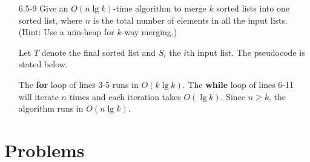 \begin{enumerate}
\item[6.5{-}9]{Give an $O(n \lg k)$-time algorithm to merge $k$ sorted lists
into one sorted list, where $n$ is the total number of elements in all the input
lists. (Hint: Use a min-heap for $k$-way merging.)}

\begin{framed}
Let $T$ denote the final sorted list and $S_i$ the $i$th input list. The
pseudocode is stated below.

\begin{algorithm}[H]
\SetAlgoNoEnd\DontPrintSemicolon
\BlankLine
{}
\end{algorithm}

The \textbf{for} loop of lines 3{-}5 runs in $O(k \lg k)$. The \textbf{while}
loop of lines 6{-}11 will iterate $n$ times and each iteration takes $O(\lg k)$.
Since $n \ge k$, the algorithm runs in $O(n \lg k)$.
\end{framed}

\end{enumerate}

\newpage

\section*{Problems}
%

